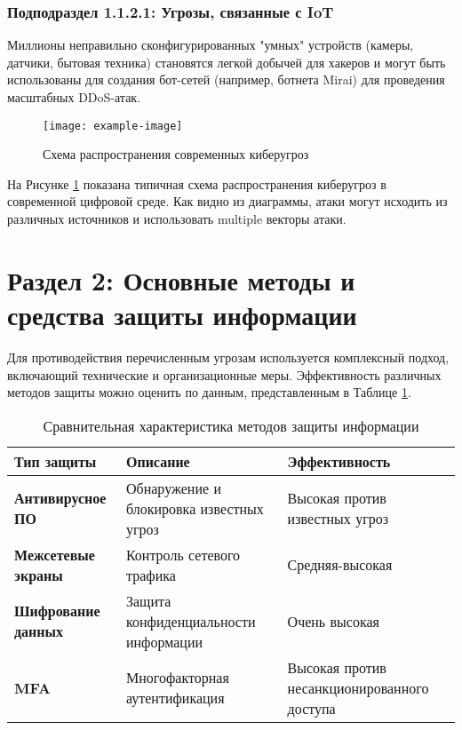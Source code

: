 \documentclass[14pt]{extreport}
\begin{document}
\subsubsection{Подподраздел 1.1.2.1: Угрозы, связанные с IoT}
\label{subsubsec:iot}

Миллионы неправильно сконфигурированных "умных" устройств (камеры, датчики, бытовая техника) становятся легкой добычей для хакеров и могут быть использованы для создания бот-сетей (например, ботнета Mirai) для проведения масштабных DDoS-атак.

\begin{figure}[H]
\centering
\texttt{[image: example-image]} 
\caption{Схема распространения современных киберугроз}
\label{fig:threats}
\end{figure}

На Рисунке \ref{fig:threats} показана типичная схема распространения киберугроз в современной цифровой среде. Как видно из диаграммы, атаки могут исходить из различных источников и использовать multiple векторы атаки.

\section{Раздел 2: Основные методы и средства защиты информации}
\label{sec:protection}

Для противодействия перечисленным угрозам используется комплексный подход, включающий технические и организационные меры. Эффективность различных методов защиты можно оценить по данным, представленным в Таблице \ref{tab:protection}.

\begin{table}[H]
\centering
\begin{tabular}{|p{}|p{}|p{}|}
\hline
\textbf{Тип защиты} & \textbf{Описание} & \textbf{Эффективность} \\
\hline
\textbf{Антивирусное ПО} & Обнаружение и блокировка известных угроз & Высокая против известных угроз \\
\hline
\textbf{Межсетевые экраны} & Контроль сетевого трафика & Средняя-высокая \\
\hline
\textbf{Шифрование данных} & Защита конфиденциальности информации & Очень высокая \\
\hline
\textbf{MFA} & Многофакторная аутентификация & Высокая против несанкционированного доступа \\
\hline
\end{tabular}
\caption{Сравнительная характеристика методов защиты информации}
\label{tab:protection}
\end{table}
\end{document}
